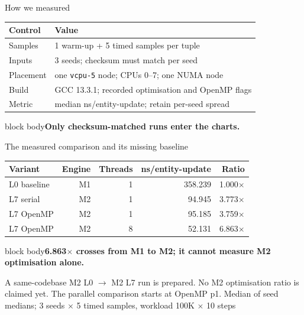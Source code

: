 \documentclass[aspectratio=169,10pt]{beamer}
\newcommand{\claim}[1]{\begin{beamercolorbox}[rounded=true,sep=.65em,wd=\linewidth]{block body}\centering\bfseries\color{moss}#1\end{beamercolorbox}}
\newcommand{\smallsource}[1]{\vfill\hfill{\scriptsize\color{muted}#1}}
\begin{document}
\begin{frame}{How we measured}
\centering
{}
\vspace{.4em}
{\setlength{\tabcolsep}{3pt}\renewcommand{\arraystretch}{.94}
\begin{tabular}{@{}lp{.72\linewidth}@{}}
\toprule
Control & Value \\
\midrule
Samples & 1 warm-up + 5 timed samples per tuple \\
Inputs & 3 seeds; checksum must match per seed \\
Placement & one \texttt{vcpu-5} node; CPUs 0--7; one NUMA node \\
Build & GCC 13.3.1; recorded optimisation and OpenMP flags \\
Metric & median ns/entity-update; retain per-seed spread \\
\bottomrule
\end{tabular}
}
\vspace{.45em}
\claim{Only checksum-matched runs enter the charts.}
\end{frame}

\begin{frame}{The measured comparison and its missing baseline}
\centering
\begin{tabular}{lrrrr}
\toprule
Variant & Engine & Threads & ns/entity-update & Ratio \\
\midrule
L0 baseline & M1 & 1 & 358.239 & 1.000$\times$ \\
L7 serial & M2 & 1 & 94.945 & 3.773$\times$ \\
L7 OpenMP & M2 & 1 & 95.185 & 3.759$\times$ \\
L7 OpenMP & M2 & 8 & 52.131 & 6.863$\times$ \\
\bottomrule
\end{tabular}
\vspace{.8em}
\claim{6.863$\times$ crosses from M1 to M2; it cannot measure M2 optimisation alone.}
\vspace{.35em}
\small A same-codebase M2 L0 $\rightarrow$ M2 L7 run is prepared. No M2 optimisation ratio is claimed yet. The parallel comparison starts at OpenMP p1.
\smallsource{Median of seed medians; 3 seeds $\times$ 5 timed samples, workload 100K $\times$ 10 steps}
\end{frame}
\end{document}
